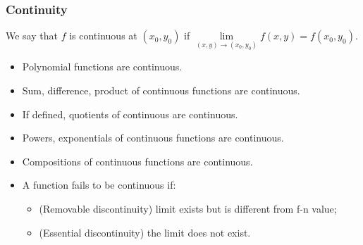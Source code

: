 \begin{frame}
\frametitle{Continuity}
\begin{definition}
We say that $f$ is continuous at $(x_0,y_0)$ if $\lim\limits_{(x,y) \to (x_0,y_0)} f(x,y) = f(x_0,y_0).$
\end{definition}
\begin{itemize}
\item<3-> Polynomial functions are continuous.
\item<4-> Sum, difference, product of continuous functions are continuous.
\item<5-> If defined, quotients of continuous are continuous.
\item<6-> Powers, exponentials of continuous functions are continuous.
\item<7-> Compositions of continuous functions are continuous.
\item<8-> A function fails to be continuous if:
\begin{itemize}
\item<9-> (Removable discontinuity) limit exists but is different from f-n value;
\item<10-> (Essential discontinuity) the limit does not exist.
\end{itemize}
\end{itemize}
\end{frame}